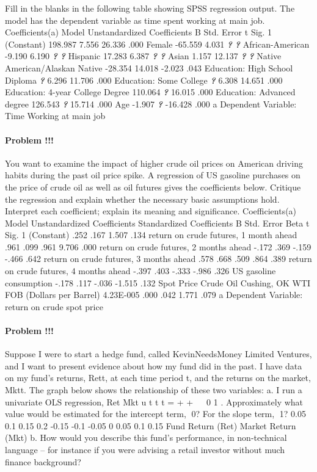 \documentclass[]{article}
\let\oldparagraph\paragraph
\renewcommand{\paragraph}[1]{\oldparagraph{#1}\mbox{}}
\begin{document}
Fill in the blanks in the following table showing SPSS regression
output. The model has the dependent variable as time spent working at
main job. Coefficients(a) Model Unstandardized Coefficients B Std. Error
t Sig. 1 (Constant) 198.987 7.556 26.336 .000 Female -65.559 4.031
\textbf{\emph{?}} \textbf{\emph{?}} African-American -9.190 6.190
\textbf{\emph{?}} \textbf{\emph{?}} Hispanic 17.283 6.387
\textbf{\emph{?}} \textbf{\emph{?}} Asian 1.157 12.137 \textbf{\emph{?}}
\textbf{\emph{?}} Native American/Alaskan Native -28.354 14.018 -2.023
.043 Education: High School Diploma \textbf{\emph{?}} 6.296 11.706 .000
Education: Some College \textbf{\emph{?}} 6.308 14.651 .000 Education:
4-year College Degree 110.064 \textbf{\emph{?}} 16.015 .000 Education:
Advanced degree 126.543 \textbf{\emph{?}} 15.714 .000 Age -1.907
\textbf{\emph{?}} -16.428 .000 a Dependent Variable: Time Working at
main job

\paragraph{Problem !!!}\label{problem-7}

You want to examine the impact of higher crude oil prices on American
driving habits during the past oil price spike. A regression of US
gasoline purchases on the price of crude oil as well as oil futures
gives the coefficients below. Critique the regression and explain
whether the necessary basic assumptions hold. Interpret each
coefficient; explain its meaning and significance. Coefficients(a) Model
Unstandardized Coefficients Standardized Coefficients B Std. Error Beta
t Sig. 1 (Constant) .252 .167 1.507 .134 return on crude futures, 1
month ahead .961 .099 .961 9.706 .000 return on crude futures, 2 months
ahead -.172 .369 -.159 -.466 .642 return on crude futures, 3 months
ahead .578 .668 .509 .864 .389 return on crude futures, 4 months ahead
-.397 .403 -.333 -.986 .326 US gasoline consumption -.178 .117 -.036
-1.515 .132 Spot Price Crude Oil Cushing, OK WTI FOB (Dollars per
Barrel) 4.23E-005 .000 .042 1.771 .079 a Dependent Variable: return on
crude spot price

\paragraph{Problem !!!}\label{problem-8}

Suppose I were to start a hedge fund, called KevinNeedsMoney Limited
Ventures, and I want to present evidence about how my fund did in the
past. I have data on my fund's returns, Rett, at each time period t, and
the returns on the market, Mktt. The graph below shows the relationship
of these two variables: a. I run a univariate OLS regression, Ret Mkt u
t t t = + +   0 1 . Approximately what value would be estimated for
the intercept term, 0? For the slope term, 1? 0.05 0.1 0.15 0.2 -0.15
-0.1 -0.05 0 0.05 0.1 0.15 Fund Return (Ret) Market Return (Mkt) b. How
would you describe this fund's performance, in non-technical language --
for instance if you were advising a retail investor without much finance
background?
\end{document}
